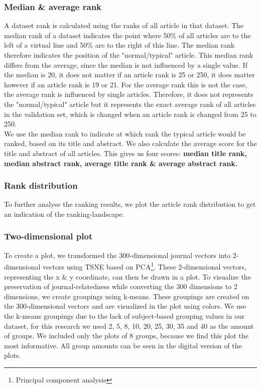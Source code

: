 \documentclass[../../Thesis.tex]{subfiles}
\begin{document}
\subsubsection{Median \& average rank}
A dataset rank is calculated using the ranks of all article in that dataset. The median rank of a dataset indicates the point where 50\% of all articles are to the left of a virtual line and 50\% are to the right of this line. The median rank therefore indicates the position of the "normal/typical" article. This median rank differs from the average, since the median is not influenced by a single value. If the median is 20, it does not matter if an article rank is 25 or 250, it does matter however if an article rank is 19 or 21. For the average rank this is not the case, the average rank is influenced by single articles. Therefore, it does not represents the "normal/typical" article but it represents the exact average rank of all articles in the validation set, which is changed when an article rank is changed from 25 to 250.\\
We use the median rank to indicate at which rank the typical article would be ranked, based on its title and abstract. We also calculate the average score for the title and abstract of all articles. This gives us four scores: \textbf{median title rank, median abstract rank, average title rank \& average abstract rank.}
\subsubsection{Rank distribution}
To further analyse the ranking results, we plot the article rank distribution to get an indication of the ranking-landscape.
\subsubsection{Two-dimensional plot}
To create a plot, we transformed the 300-dimensional journal vectors into 2-dimensional vectors using TSNE based on PCA\footnote{Principal component analysis}. These 2-dimensional vectors, representing the x \& y coordinate, can then be drawn in a plot. To visualize the preservation of journal-relatedness while converting the 300 dimensions to 2 dimensions, we create groupings using k-means. These groupings are created on the 300-dimensional vectors and are visualized in the plot using colors. We use the k-means groupings due to the lack of subject-based grouping values in our dataset, for this research we used 2, 5, 8, 10, 20, 25, 30, 35 and 40 as the amount of groups. We included only the plots of 8 groups, because we find this plot the most informative. All group amounts can be seen in the digital version of the plots.
\end{document}
